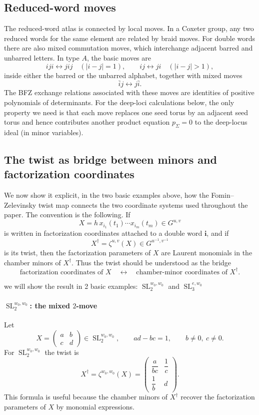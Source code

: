 \documentclass[12pt]{amsart}
\newcommand{\SL}{\operatorname{SL}}
\theoremstyle{plain}
\theoremstyle{definition}
\theoremstyle{remark}
\begin{document}
\subsection{Reduced-word moves}

The reduced-word atlas is connected by local moves.  In a Coxeter group, any two reduced words for the same element are related by braid moves.  For double words there are also mixed commutation moves, which interchange adjacent barred and unbarred letters.  In type $A$, the basic moves are
\[
   i j i \leftrightarrow j i j
   \quad (|i-j|=1),
   \qquad
   i j\leftrightarrow j i
   \quad (|i-j|>1),
\]
inside either the barred or the unbarred alphabet, together with mixed moves
\[
   \bar i j\leftrightarrow j\bar i.
\]
The BFZ exchange relations associated with these moves are identities of positive polynomials of determinants.  For the deep-loci calculations below, the only property we need is that each move replaces one seed torus by an adjacent seed torus and hence contributes another product equation $p_\Sigma=0$ to the deep-locus ideal (in minor variables).

\subsection{The twist as bridge between minors and factorization coordinates}

We now show it explicit, in the two basic examples above, how the Fomin--Zelevinsky twist map
connects the two coordinate systems used throughout the paper.  The convention is the following.
If
\[
X=h\,x_{i_1}(t_1)\cdots x_{i_m}(t_m)\in G^{u,v}
\]
is written in factorization coordinates attached to a double word $\mathbf i$, and if
\[
X^\dagger=\zeta^{u,v}(X)\in G^{u^{-1},v^{-1}}
\]
is its twist, then the factorization parameters of $X$ are Laurent monomials in the chamber
minors of $X^\dagger$.  Thus the twist should be understood as the bridge
\[
\text{factorization coordinates of } X
\quad\longleftrightarrow\quad
\text{chamber-minor coordinates of } X^\dagger .
\]

we will show the result in 2 basic examples: $\SL_2^{w_0,w_0}$ and $\SL_3^{e,w_0}$

\paragraph{\bf \texorpdfstring{$\SL_2^{w_0,w_0}$: the mixed $2$-move}{SL2: the mixed 2-move}}

Let
\[
X=
\begin{pmatrix}
a&b\\
c&d
\end{pmatrix}\in \SL_2^{w_0,w_0},
\qquad
ad-bc=1,
\qquad
b\neq 0,\ c\neq 0 .
\]
For $\SL_2^{w_0,w_0}$ the twist is
\[
X^\dagger=\zeta^{w_0,w_0}(X)
=
\begin{pmatrix}
\dfrac{a}{bc} & \dfrac{1}{c}\\[6pt]
\dfrac{1}{b} & d
\end{pmatrix}.
\]
This formula is useful because the chamber minors of $X^\dagger$ recover the factorization
parameters of $X$ by monomial expressions.
\end{document}

